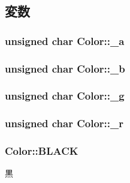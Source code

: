 \subsection{変数}
\hypertarget{struct_color_af9b0213d8532a292da67d4525b81a6ec}{
\subsubsection[{\-\_\-a}]{\setlength{\rightskip}{0pt plus 5cm}unsigned char Color\-::\-\_\-a}}\label{struct_color_af9b0213d8532a292da67d4525b81a6ec}
\hypertarget{struct_color_a9a9e3820e73e7786817d0e5f314835b4}{
\subsubsection[{\-\_\-b}]{\setlength{\rightskip}{0pt plus 5cm}unsigned char Color\-::\-\_\-b}}\label{struct_color_a9a9e3820e73e7786817d0e5f314835b4}
\hypertarget{struct_color_a365597f2503cf58a343b48110f0cc254}{
\subsubsection[{\-\_\-g}]{\setlength{\rightskip}{0pt plus 5cm}unsigned char Color\-::\-\_\-g}}\label{struct_color_a365597f2503cf58a343b48110f0cc254}
\hypertarget{struct_color_a0c71513f8081799f4d51345bab7b67f8}{
\subsubsection[{\-\_\-r}]{\setlength{\rightskip}{0pt plus 5cm}unsigned char Color\-::\-\_\-r}}\label{struct_color_a0c71513f8081799f4d51345bab7b67f8}
\hypertarget{struct_color_a6f7dc225ef0b3dde655cbf925cad882d}{
\subsubsection[{B\-L\-A\-C\-K}]{ Color\-::\-B\-L\-A\-C\-K\hspace{0.3cm}{\ttfamily [static]}}}\label{struct_color_a6f7dc225ef0b3dde655cbf925cad882d}


黒 

